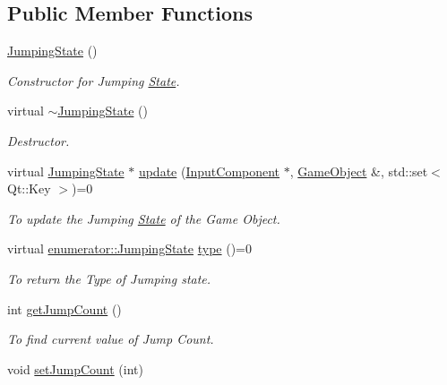 \subsection*{Public Member Functions}
\begin{DoxyCompactItemize}
\item 
\hypertarget{classJumpingState_a74a6fbd65de0937c949cb04d7567041f}{\hyperlink{classJumpingState_a74a6fbd65de0937c949cb04d7567041f}{Jumping\-State} ()}\label{classJumpingState_a74a6fbd65de0937c949cb04d7567041f}

\begin{DoxyCompactList}\small\item\em Constructor for Jumping \hyperlink{classState}{State}. \end{DoxyCompactList}\item 
\hypertarget{classJumpingState_aa8fed3f92395e3b1a5c0ab71387fe7da}{virtual \hyperlink{classJumpingState_aa8fed3f92395e3b1a5c0ab71387fe7da}{$\sim$\-Jumping\-State} ()}\label{classJumpingState_aa8fed3f92395e3b1a5c0ab71387fe7da}

\begin{DoxyCompactList}\small\item\em Destructor. \end{DoxyCompactList}\item 
virtual \hyperlink{classJumpingState}{Jumping\-State} $\ast$ \hyperlink{classJumpingState_a0da4718d614ff36fd1336f01f5ddfa2b}{update} (\hyperlink{classInputComponent}{Input\-Component} $\ast$, \hyperlink{classGameObject}{Game\-Object} \&, std\-::set$<$ Qt\-::\-Key $>$)=0
\begin{DoxyCompactList}\small\item\em To update the Jumping \hyperlink{classState}{State} of the Game Object. \end{DoxyCompactList}\item 
virtual \hyperlink{namespaceenumerator_a2f1fb1ef7c57e4549f424d454c1e2179}{enumerator\-::\-Jumping\-State} \hyperlink{classJumpingState_a3c1a2e3c686de946c16e20c717f0a37d}{type} ()=0
\begin{DoxyCompactList}\small\item\em To return the Type of Jumping state. \end{DoxyCompactList}\item 
int \hyperlink{classJumpingState_a254b08129da2b292be700307f6c31af0}{get\-Jump\-Count} ()
\begin{DoxyCompactList}\small\item\em To find current value of Jump Count. \end{DoxyCompactList}\item 
\hypertarget{classJumpingState_ad3caaec1aa20d63f5a86de1004263ca2}{void \hyperlink{classJumpingState_ad3caaec1aa20d63f5a86de1004263ca2}{set\-Jump\-Count} (int)}\label{classJumpingState_ad3caaec1aa20d63f5a86de1004263ca2}


\end{DoxyCompactItemize}
